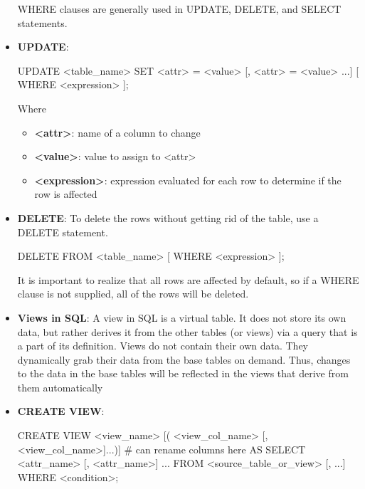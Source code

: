 \documentclass{report}
\begin{document}
\begin{itemize}
            \bigbreak \noindent 
            WHERE clauses are generally used in UPDATE, DELETE, and SELECT statements.
        \item \textbf{UPDATE}:
            \bigbreak \noindent 
            \begin{sqlcode}
                UPDATE <table_name>
                    SET <attr> = <value> [, <attr> = <value> ...]
                    [ WHERE <expression> ];
            \end{sqlcode}
            \bigbreak \noindent 
            Where
            \begin{itemize}
                \item \textbf{<attr>}: name of a column to change
                \item \textbf{<value>}: value to assign to <attr>
                \item \textbf{<expression>}: expression evaluated for each row to determine if the row is affected
            \end{itemize}
        \item \textbf{DELETE}: To delete the rows without getting rid of the table, use a DELETE statement.
            \bigbreak \noindent 
            \begin{sqlcode}
            DELETE FROM <table_name>
                [ WHERE <expression> ];
            \end{sqlcode}
            \bigbreak \noindent 
            It is important to realize that all rows are affected by default, so if a WHERE clause is not supplied, all of the rows will be deleted.
        \item \textbf{Views in SQL}: A view in SQL is a virtual table. It does not store its own data, but rather derives it from the other tables (or views) via a query that is a part of its definition.
            \bigbreak \noindent 
                Views do not contain their own data. They dynamically grab their data from the base tables on demand. Thus, changes to the data in the base tables will be reflected in the views that derive from them automatically
        \item \textbf{CREATE VIEW}:
            \bigbreak \noindent 
            \begin{sqlcode}
                CREATE VIEW <view_name>
                    [( <view_col_name> [, <view_col_name>]...)] # can rename columns here
                    AS SELECT <attr_name> [, <attr_name>] ...
                        FROM <source_table_or_view> [, ...]
                        WHERE <condition>;

\end{sqlcode}
\end{itemize}
\end{document}
